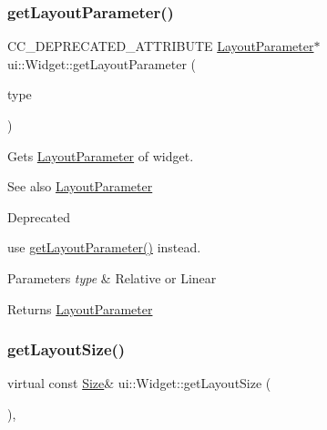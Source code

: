 \subsubsection{\texorpdfstring{get\+Layout\+Parameter()}{getLayoutParameter()}\hspace{0.1cm}{\footnotesize\ttfamily [4/4]}}
{\footnotesize\ttfamily C\+C\+\_\+\+D\+E\+P\+R\+E\+C\+A\+T\+E\+D\+\_\+\+A\+T\+T\+R\+I\+B\+U\+TE \hyperlink{classui_1_1LayoutParameter}{Layout\+Parameter}$\ast$ ui\+::\+Widget\+::get\+Layout\+Parameter (\begin{DoxyParamCaption}\item[{\hyperlink{classui_1_1LayoutParameter_a1b01e01e7e6fc3de80f2e6d07fae806e}{Layout\+Parameter\+::\+Type}}]{type }\end{DoxyParamCaption})}

Gets \hyperlink{classui_1_1LayoutParameter}{Layout\+Parameter} of widget.

\begin{DoxySeeAlso}{See also}
\hyperlink{classui_1_1LayoutParameter}{Layout\+Parameter} 
\end{DoxySeeAlso}
\begin{DoxyRefDesc}{Deprecated}
\item[\hyperlink{deprecated__deprecated000414}{Deprecated}]use {\ttfamily \hyperlink{classui_1_1Widget_a25425cde194b4f37f56f938bb69a9a96}{get\+Layout\+Parameter()}} instead. \end{DoxyRefDesc}

\begin{DoxyParams}{Parameters}
{\em type} & Relative or Linear \\
\hline
\end{DoxyParams}
\begin{DoxyReturn}{Returns}
\hyperlink{classui_1_1LayoutParameter}{Layout\+Parameter} 
\end{DoxyReturn}
\mbox{\label{classui_1_1Widget_a170d1942e94f24cc01aa7cb146b10dc8}} 
\subsubsection{\texorpdfstring{get\+Layout\+Size()}{getLayoutSize()}\hspace{0.1cm}{\footnotesize\ttfamily [1/2]}}
{\footnotesize\ttfamily virtual const \hyperlink{classSize}{Size}\& ui\+::\+Widget\+::get\+Layout\+Size (\begin{DoxyParamCaption}{ }\end{DoxyParamCaption})\hspace{0.3cm}{\ttfamily [inline]}, {\ttfamily [virtual]}}

